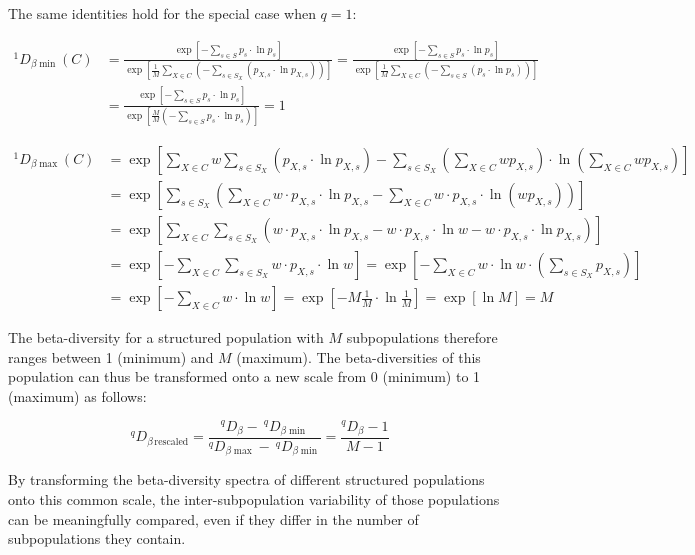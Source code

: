 \noindent The same identities hold for the special case when $q = 1$:

\begin{equation}
\begin{split}
^1D_{\beta\min}(C) & = \frac{\exp\left[-\sum_{s \in S}p_s \cdot\ln p_s\right]}{\exp\left[\frac{1}{M}\sum_{X \in C}\left(-\sum_{s \in S_X}(p_{X,s}\cdot\ln p_{X,s})\right)\right]} = \frac{\exp\left[-\sum_{s \in S}p_s \cdot\ln p_s\right]}{\exp\left[\frac{1}{M}\sum_{X \in C}\left(-\sum_{s \in S}(p_{s}\cdot\ln p_{s})\right)\right]}\\
& = \frac{\exp\left[-\sum_{s \in S}p_s \cdot\ln p_s\right]}{\exp\left[\frac{M}{M}\left(-\sum_{s \in S}p_{s}\cdot\ln p_{s}\right)\right]} = 1
\end{split}
\label{eq:diversity_beta_q1_min}
\end{equation}

\begin{equation}\begin{split}
^1D_{\beta\max}(C)
& = \exp\left[\sum_{X \in C}w\sum_{s \in S_X}(p_{X,s}\cdot\ln p_{X,s})-\sum_{s \in S_X}\left(\sum_{X \in C}wp_{X,s}\right)\cdot\ln \left(\sum_{X \in C}wp_{X,s}\right)\right]\\
& = \exp\left[\sum_{s \in S_X}\left(\sum_{X \in C}w \cdot p_{X,s}\cdot\ln p_{X,s} - \sum_{X \in C} w \cdot p_{X,s} \cdot\ln \left(wp_{X,s}\right)\right)\right]\\
& = \exp\left[\sum_{X \in C}\sum_{s \in S_X}\left(w \cdot p_{X,s}\cdot\ln p_{X,s} - w \cdot p_{X,s} \cdot\ln w - w \cdot p_{X,s} \cdot\ln p_{X,s}\right)\right]\\
& = \exp\left[-\sum_{X \in C}\sum_{s \in S_X} w \cdot p_{X,s} \cdot \ln w \right]
 = \exp\left[-\sum_{X \in C} w \cdot \ln w \cdot \left(\sum_{s \in S_X} p_{X,s}\right)\right]\\
& = \exp\left[-\sum_{X \in C} w \cdot \ln w \right]
= \exp\left[-M \frac{1}{M} \cdot \ln \frac{1}{M} \right]
= \exp[\ln M] = M
\end{split}
\label{eq:diversity_beta_q1_max}
\end{equation} %

The beta-diversity for a structured population with $M$ subpopulations therefore ranges between 1 (minimum) and $M$ (maximum). The beta-diversities of this population can thus be transformed onto a new scale from 0 (minimum) to 1 (maximum) as follows:

\begin{equation}
^qD_{\beta\,\mathrm{rescaled}} = \frac{^qD_\beta -\:^qD_{\beta\min}}{^qD_{\beta\max} -\: ^qD_{\beta\min}} = \frac{^qD_\beta - 1}{M - 1}
\label{eq:diversity_beta_rescale}
\end{equation}

By transforming the beta-diversity spectra of different structured populations onto this common scale, the inter-subpopulation variability of those populations can be meaningfully compared, even if they differ in the number of subpopulations they contain.